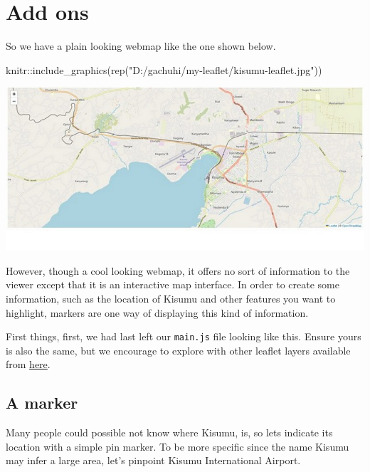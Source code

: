 \documentclass[
]{book}
\newenvironment{Shaded}{\begin{snugshade}}{\end{snugshade}}
\newcommand{\FunctionTok}[1]{\textcolor[rgb]{0.00,0.00,0.00}{#1}}
\newcommand{\NormalTok}[1]{#1}
\newcommand{\SpecialCharTok}[1]{\textcolor[rgb]{0.00,0.00,0.00}{#1}}
\newcommand{\StringTok}[1]{\textcolor[rgb]{0.31,0.60,0.02}{#1}}
\theoremstyle{definition}
\theoremstyle{definition}
\theoremstyle{definition}
\theoremstyle{definition}
\theoremstyle{remark}
\begin{document}
\hypertarget{add-ons}{%
\chapter{Add ons}\label{add-ons}}

So we have a plain looking webmap like the one shown below.

\begin{Shaded}
\begin{Highlighting}[]
\NormalTok{knitr}\SpecialCharTok{::}\FunctionTok{include\_graphics}\NormalTok{(}\FunctionTok{rep}\NormalTok{(}\StringTok{"D:/gachuhi/my{-}leaflet/kisumu{-}leaflet.jpg"}\NormalTok{))}
\end{Highlighting}
\end{Shaded}

\includegraphics[width=11.11in]{../kisumu-leaflet}

However, though a cool looking webmap, it offers no sort of information to the viewer except that it is an interactive map interface. In order to create some information, such as the location of Kisumu and other features you want to highlight, markers are one way of displaying this kind of information.

First things, first, we had last left our \texttt{main.js} file looking like this. Ensure yours is also the same, but we encourage to explore with other leaflet layers available from \href{https://leaflet-extras.github.io/leaflet-providers/preview/}{here}.

\hypertarget{a-marker}{%
\section{A marker}\label{a-marker}}

Many people could possible not know where Kisumu, is, so lets indicate its location with a simple pin marker. To be more specific since the name Kisumu may infer a large area, let's pinpoint Kisumu International Airport.
\end{document}
